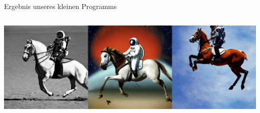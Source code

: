 \begin{frame}{Ergebnis unseres kleinen Programms}
    \begin{columns}
        \includegraphics[width=\textwidth]{img/ai-gallery3}
    \end{columns}
\end{frame}
